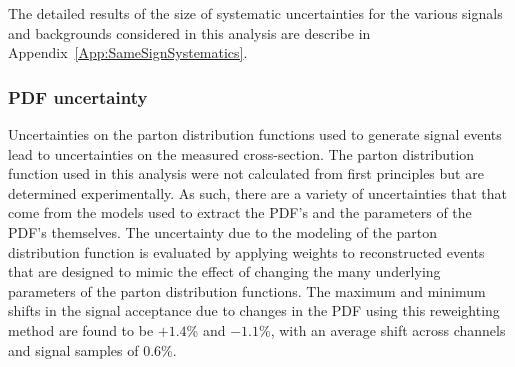 The detailed results of the size of systematic uncertainties for the various signals and backgrounds
considered in this analysis are describe in Appendix~\ref{App:SameSignSystematics}.

\subsubsection{PDF uncertainty}
Uncertainties on the parton distribution functions used to generate signal events lead to uncertainties on the measured cross-section.
The parton distribution function used in this analysis were not calculated from first principles but are determined experimentally.
As such, there are a variety of uncertainties that that come from the models used to extract the PDF's
and the parameters of the PDF's themselves.
The uncertainty due to the modeling of the parton distribution function is evaluated by applying weights to reconstructed events
that are designed to mimic the effect of changing the many underlying parameters of the parton distribution functions.
The maximum and minimum shifts in the signal acceptance due to changes in the PDF using this reweighting method
are found to be $+1.4$\% and $-1.1$\%, with an average shift across channels and signal samples of 0.6\%.


